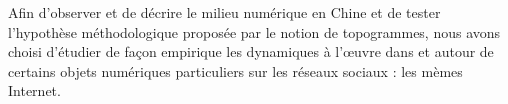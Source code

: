 Afin d’observer et de décrire le milieu numérique en Chine et de tester l’hypothèse méthodologique proposée par le notion de topogrammes, nous avons choisi d’étudier de façon empirique les dynamiques à l’œuvre dans et autour de certains objets numériques particuliers sur les réseaux sociaux : les mèmes Internet. 
